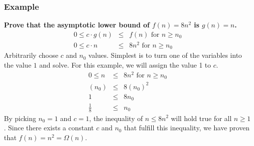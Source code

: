 \subsubsection{Example}
\textbf{Prove that the asymptotic lower bound of $f(n) = 8n^2$ is $g(n) = n$.}
\begin{eqnarray*}
	0 \leq c \cdot g(n) &\leq& f(n) \text{ for } n \geq n_0\\
	0 \leq c \cdot n &\leq& 8n^2 \text{ for } n \geq n_0
\end{eqnarray*}
Arbitrarily choose $c$ and $n_0$ values. Simplest is to turn one of the variables into the value $1$ and solve. For this example, we will assign the value 1 to $c$.
\begin{eqnarray*}
	0 \leq n &\leq& 8n^2 \text{ for } n \geq n_0\\
		   (n_0) &\leq& 8(n_0)^2\\
		   1 &\leq& 8n_0\\
		   \frac{1}{8} &\leq& n_0
\end{eqnarray*}
By picking $n_0 = 1$ and $c = 1$, the inequality of $n \leq 8n^2$ will hold true for all $n \geq 1$. Since there exists a constant $c$ and $n_0$ that fulfill this inequality, we have proven that $f(n) = n^2 = \Omega(n)$.